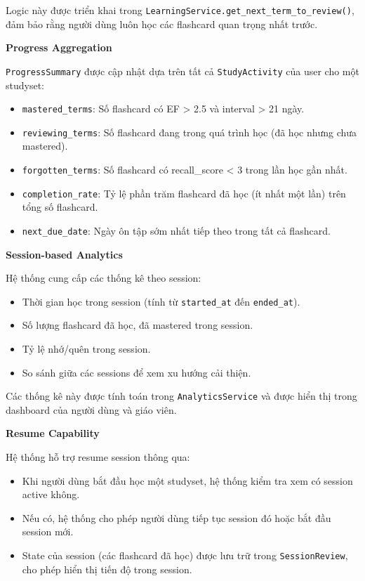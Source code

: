 \documentclass[../DoAn.tex]{subfiles}
\begin{document}
Logic này được triển khai trong \texttt{LearningService.get\_next\_term\_to\_review()}, đảm bảo rằng người dùng luôn học các flashcard quan trọng nhất trước.

\textbf{Progress Aggregation}

\texttt{ProgressSummary} được cập nhật dựa trên tất cả \texttt{StudyActivity} của user cho một studyset:

\begin{itemize}
    \item \texttt{mastered\_terms}: Số flashcard có EF > 2.5 và interval > 21 ngày.
    \item \texttt{reviewing\_terms}: Số flashcard đang trong quá trình học (đã học nhưng chưa mastered).
    \item \texttt{forgotten\_terms}: Số flashcard có recall\_score < 3 trong lần học gần nhất.
    \item \texttt{completion\_rate}: Tỷ lệ phần trăm flashcard đã học (ít nhất một lần) trên tổng số flashcard.
    \item \texttt{next\_due\_date}: Ngày ôn tập sớm nhất tiếp theo trong tất cả flashcard.
\end{itemize}

\textbf{Session-based Analytics}

Hệ thống cung cấp các thống kê theo session:

\begin{itemize}
    \item Thời gian học trong session (tính từ \texttt{started\_at} đến \texttt{ended\_at}).
    \item Số lượng flashcard đã học, đã mastered trong session.
    \item Tỷ lệ nhớ/quên trong session.
    \item So sánh giữa các sessions để xem xu hướng cải thiện.
\end{itemize}

Các thống kê này được tính toán trong \texttt{AnalyticsService} và được hiển thị trong dashboard của người dùng và giáo viên.

\textbf{Resume Capability}

Hệ thống hỗ trợ resume session thông qua:

\begin{itemize}
    \item Khi người dùng bắt đầu học một studyset, hệ thống kiểm tra xem có session active không.
    \item Nếu có, hệ thống cho phép người dùng tiếp tục session đó hoặc bắt đầu session mới.
    \item State của session (các flashcard đã học) được lưu trữ trong \texttt{SessionReview}, cho phép hiển thị tiến độ trong session.
\end{itemize}
\end{document}
